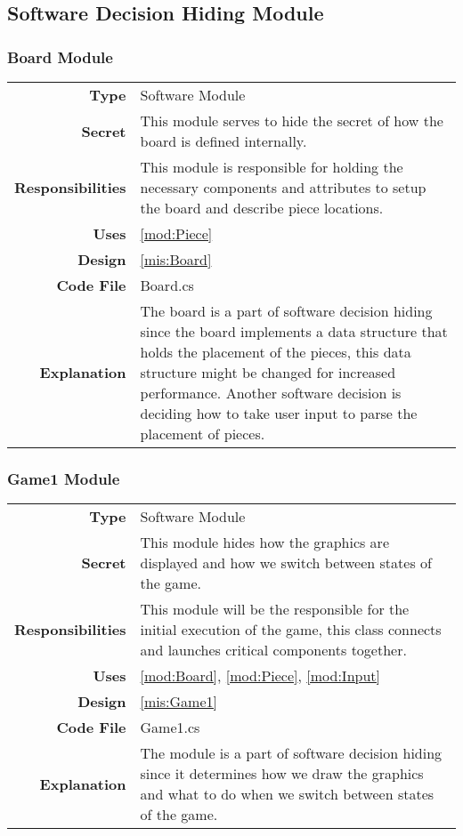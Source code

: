\documentclass[10pt]{article}
\makeatletter
\newcommand{\CustomLabel}[1]{\Hy@raisedlink{\hypertarget{#1}{}}\label{#1}}
\makeatother
\begin{document}
\subsection{Software Decision Hiding Module}

    \subsubsection{Board Module}\CustomLabel{mod:Board}
        \begin{tabularx}{\linewidth}{ >{\bfseries}r X }
            Type            & Software Module \\
            Secret          & This module serves to hide the secret of how the board is defined internally. \\
            Responsibilities & This module is responsible for holding the necessary components and attributes to setup the board and describe piece locations. \\
            Uses            & \ref{mod:Piece} \\
            Design          & \ref{mis:Board} \\
            Code File       & Board.cs \\
            Explanation     & The board is a part of software decision hiding since the board implements a data structure that holds the placement of the pieces, this data structure might be changed for increased performance. Another software decision is deciding how to take user input to parse the placement of pieces. \\
        \end{tabularx}

    \subsubsection{Game1 Module}\CustomLabel{mod:Game1}
        \begin{tabularx}{\linewidth}{ >{\bfseries}r X }
            Type            & Software Module \\
            Secret          & This module hides how the graphics are displayed and how we switch between states of the game. \\
            Responsibilities & This module will be the responsible for the initial execution of the game, this class connects and launches critical components together. \\
            Uses            & \ref{mod:Board}, \ref{mod:Piece}, \ref{mod:Input} \\
            Design          & \ref{mis:Game1} \\
            Code File       & Game1.cs \\
            Explanation     & The module is a part of software decision hiding since it determines how we draw the graphics and what to do when we switch between states of the game. \\
        \end{tabularx}
        
\end{document}

